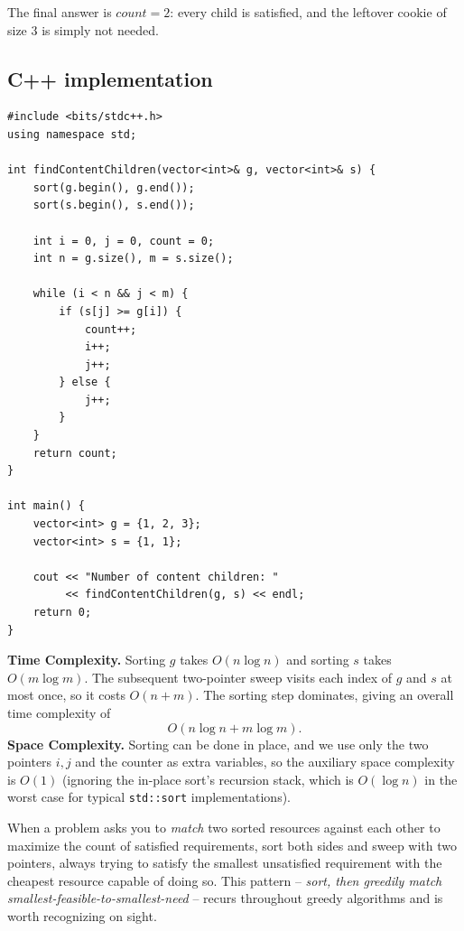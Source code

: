The final answer is $\textit{count} = 2$: every child is satisfied, and the
leftover cookie of size $3$ is simply not needed.

\subsection*{C++ implementation}

\begin{lstlisting}
#include <bits/stdc++.h>
using namespace std;

int findContentChildren(vector<int>& g, vector<int>& s) {
    sort(g.begin(), g.end());
    sort(s.begin(), s.end());

    int i = 0, j = 0, count = 0;
    int n = g.size(), m = s.size();

    while (i < n && j < m) {
        if (s[j] >= g[i]) {
            count++;
            i++;
            j++;
        } else {
            j++;
        }
    }
    return count;
}

int main() {
    vector<int> g = {1, 2, 3};
    vector<int> s = {1, 1};

    cout << "Number of content children: "
         << findContentChildren(g, s) << endl;
    return 0;
}
\end{lstlisting}

\begin{complexitybox}
\textbf{Time Complexity.} Sorting $g$ takes $O(n \log n)$ and sorting $s$
takes $O(m \log m)$. The subsequent two-pointer sweep visits each index of
$g$ and $s$ at most once, so it costs $O(n + m)$. The sorting step dominates,
giving an overall time complexity of
\[
  O(n \log n + m \log m).
\]
\textbf{Space Complexity.} Sorting can be done in place, and we use only the
two pointers $i, j$ and the counter as extra variables, so the auxiliary
space complexity is $O(1)$ (ignoring the in-place sort's recursion stack,
which is $O(\log n)$ in the worst case for typical \texttt{std::sort}
implementations).
\end{complexitybox}

\begin{takeawaybox}
When a problem asks you to \emph{match} two sorted resources against each
other to maximize the count of satisfied requirements, sort both sides and
sweep with two pointers, always trying to satisfy the smallest unsatisfied
requirement with the cheapest resource capable of doing so. This pattern --
\emph{sort, then greedily match smallest-feasible-to-smallest-need} -- recurs
throughout greedy algorithms and is worth recognizing on sight.
\end{takeawaybox}
